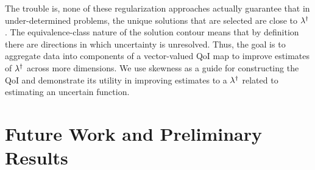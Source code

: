 The trouble is, none of these regularization approaches actually guarantee that in under-determined problems, the unique solutions that are selected are close to $\lambda^\dagger$.
The equivalence-class nature of the solution contour means that by definition there are directions in which uncertainty is unresolved.
Thus, the goal is to aggregate data into components of a vector-valued QoI map to improve estimates of $\lambda^\dagger$ across more dimensions.
We use skewness as a guide for constructing the QoI and demonstrate its utility in improving estimates to a $\lambda^\dagger$ related to estimating an uncertain function.


\section{Future Work and Preliminary Results}


\FloatBarrier



%
%



\FloatBarrier
